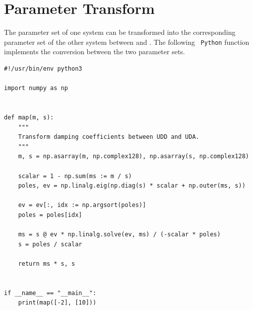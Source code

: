 \section{Parameter Transform}
The parameter set of one system can be transformed into the corresponding parameter set of the other system between  and .
The following \faPython~\texttt{Python} function implements the conversion between the two parameter sets.
\begin{verbatim}
#!/usr/bin/env python3

import numpy as np


def map(m, s):
    """
    Transform damping coefficients between UDD and UDA.
    """
    m, s = np.asarray(m, np.complex128), np.asarray(s, np.complex128)

    scalar = 1 - np.sum(ms := m / s)
    poles, ev = np.linalg.eig(np.diag(s) * scalar + np.outer(ms, s))

    ev = ev[:, idx := np.argsort(poles)]
    poles = poles[idx]

    ms = s @ ev * np.linalg.solve(ev, ms) / (-scalar * poles)
    s = poles / scalar

    return ms * s, s


if __name__ == "__main__":
    print(map([-2], [10]))
\end{verbatim}
